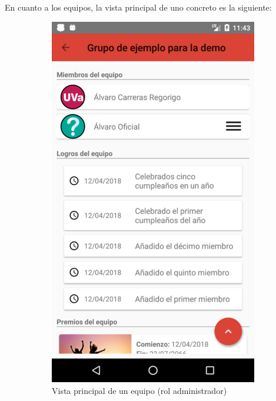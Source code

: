 \documentclass[twoside]{report}
\begin{document}
En cuanto a los equipos, la vista principal de uno concreto es la siguiente:
\begin{figure}[H]
\begin{center}
	\begin{subfigure}[t]{.3\linewidth}
		\includegraphics[scale=0.25]{images/userguide/14.png}
		\caption{Vista principal de un equipo (rol administrador)}
	\end{subfigure}\hspace{2mm}%
	\begin{subfigure}[t]{.3\linewidth}

\end{subfigure}
\end{center}
\end{figure}
\end{document}
